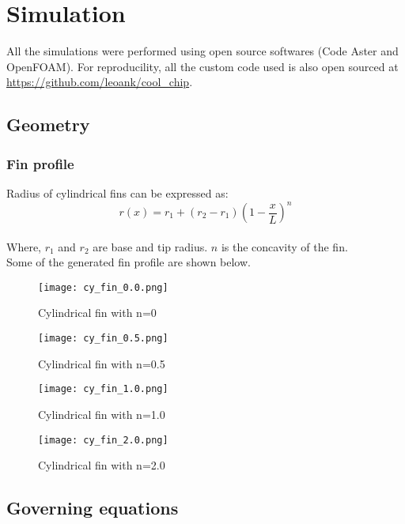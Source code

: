\documentclass[../main.tex]{subfiles}
\begin{document}
\section{Simulation}

All the simulations were performed using open source softwares (Code Aster and OpenFOAM).
For reproducility, all the custom code used is also open sourced at \href{https://github.com/leoank/cool_chip}{https://github.com/leoank/cool\_chip}.

\subsection{Geometry}

\subsubsection{Fin profile}

Radius of cylindrical fins can be expressed as:
\begin{equation}
    r(x) = r_1 + (r_2 - r_1)(1 - \frac{x}{L})^n
\end{equation}
\\
Where, $r_1$ and $r_2$ are base and tip radius. $n$ is the concavity of the fin.
\\
Some of the generated fin profile are shown below.
\begin{figure}[H]
    \centering
    \texttt{[image: cy\_fin\_0.0.png]}
    \caption{Cylindrical fin with n=0}
    \label{fig:cyfin00}
\end{figure}

\begin{figure}[H]
    \centering
    \texttt{[image: cy\_fin\_0.5.png]}
    \caption{Cylindrical fin with n=0.5}
    \label{fig:cyfin05}
\end{figure}

\begin{figure}[H]
    \centering
    \texttt{[image: cy\_fin\_1.0.png]}
    \caption{Cylindrical fin with n=1.0}
    \label{fig:cyfin10}
\end{figure}

\begin{figure}[H]
    \centering
    \texttt{[image: cy\_fin\_2.0.png]}
    \caption{Cylindrical fin with n=2.0}
    \label{fig:cyfin20}
\end{figure}

\subsection{Governing equations}
\end{document}
